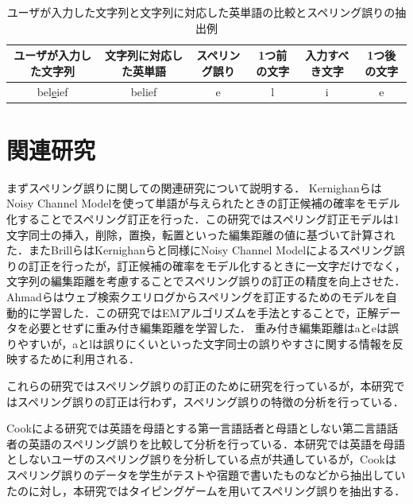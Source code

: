 \documentclass{jarticle}
\begin{document}
 \begin{table}[t]
  \small
  \centering
   \caption{ユーザが入力した文字列と文字列に対応した英単語の比較とスペリング誤りの抽出例}
   \begin{tabular}{|c|c|c|c|c|c|} \hline
       	ユーザが入力した文字列 & 文字列に対応した英単語 & スペリング誤り & 1つ前の文字 & 入力すべき文字 & 1つ後の文字\\ \hline
	    bel\underline{e}ief & belief & e & l & i & e\\ \hline
   \end{tabular}
 \end{table}

\section{関連研究}
まずスペリング誤りに関しての関連研究について説明する．
KernighanらはNoisy Channel Modelを使って単語が与えられたときの訂正候補の確率をモデル化することでスペリング訂正を行った\cite{kernighan1990spelling}．この研究ではスペリング訂正モデルは1文字同士の挿入，削除，置換，転置といった編集距離の値に基づいて計算された．またBrillらはKernighanらと同様にNoisy Channel Modelによるスペリング誤りの訂正を行ったが，訂正候補の確率をモデル化するときに一文字だけでなく，文字列の編集距離を考慮することでスペリング誤りの訂正の精度を向上させた\cite{brill2000improved}．
Ahmadらはウェブ検索クエリログからスペリングを訂正するためのモデルを自動的に学習した\cite{ahmad2005learning}．この研究ではEMアルゴリズムを手法とすることで，正解データを必要とせずに重み付き編集距離を学習した．
重み付き編集距離はaとeは誤りやすいが，aとlは誤りにくいといった文字同士の誤りやすさに関する情報を反映するために利用される．

これらの研究ではスペリング誤りの訂正のために研究を行っているが，本研究ではスペリング誤りの訂正は行わず，スペリング誤りの特徴の分析を行っている．

Cookによる研究\cite{cook1997l2}では英語を母語とする第一言語話者と母語としない第二言語話者の英語のスペリング誤りを比較して分析を行っている．本研究では英語を母語としないユーザのスペリング誤りを分析している点が共通しているが，Cookはスペリング誤りのデータを学生がテストや宿題で書いたものなどから抽出していたのに対し，本研究ではタイピングゲームを用いてスペリング誤りを抽出する．
\end{document}
